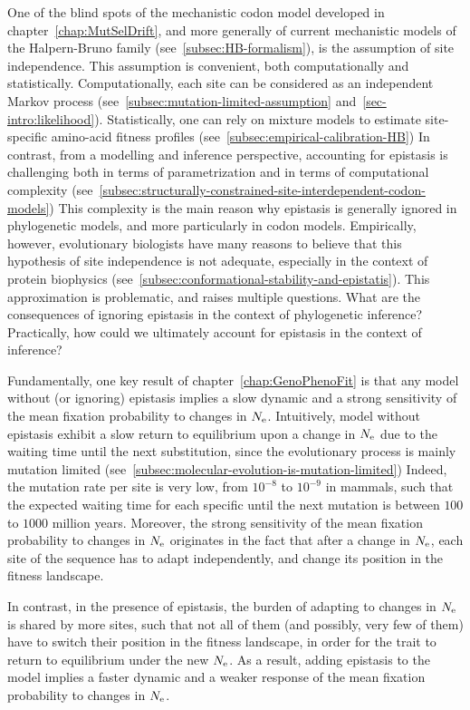 One of the blind spots of the mechanistic codon model developed in chapter~\ref{chap:MutSelDrift}, and more generally of current mechanistic models of the Halpern-Bruno family (see~\ref{subsec:HB-formalism}), is the assumption of site independence.
This assumption is convenient, both computationally and statistically.
Computationally, each site can be considered as an independent Markov process (see~\ref{subsec:mutation-limited-assumption} and~\ref{sec-intro:likelihood}).
Statistically, one can rely on mixture models to estimate site-specific amino-acid fitness profiles (see~\ref{subsec:empirical-calibration-HB})
In contrast, from a modelling and inference perspective, accounting for epistasis is challenging both in terms of parametrization and in terms of computational complexity (see~\ref{subsec:structurally-constrained-site-interdependent-codon-models})
This complexity is the main reason why epistasis is generally ignored in phylogenetic models, and more particularly in codon models.
Empirically, however, evolutionary biologists have many reasons to believe that this hypothesis of site independence is not adequate, especially in the context of protein biophysics (see~\ref{subsec:conformational-stability-and-epistatis}).
This approximation is problematic, and raises multiple questions.
What are the consequences of ignoring epistasis in the context of phylogenetic inference?
Practically, how could we ultimately account for epistasis in the context of inference?

Fundamentally, one key result of chapter~\ref{chap:GenoPhenoFit} is that any model without (or ignoring) epistasis implies a slow dynamic and a strong sensitivity of the mean fixation probability to changes in $N_{\textrm{e}}$.
Intuitively, model without epistasis exhibit a slow return to equilibrium upon a change in $N_{\textrm{e}}$ due to the waiting time until the next substitution, since the evolutionary process is mainly mutation limited (see~\ref{subsec:molecular-evolution-is-mutation-limited})
Indeed, the mutation rate per site is very low, from $10^{-8}$ to $10^{-9}$ in mammals, such that the expected waiting time for each specific until the next mutation is between $100$ to $1000$ million years.
Moreover, the strong sensitivity of the mean fixation probability to changes in $N_{\textrm{e}}$ originates in the fact that after a change in $N_{\textrm{e}}$, each site of the sequence has to adapt independently, and change its position in the fitness landscape.

In contrast, in the presence of epistasis, the burden of adapting to changes in $N_{\textrm{e}}$ is shared by more sites, such that not all of them (and possibly, very few of them) have to switch their position in the fitness landscape, in order for the trait to return to equilibrium under the new $N_{\textrm{e}}$.
As a result, adding epistasis to the model implies a faster dynamic and a weaker response of the mean fixation probability to changes in $N_{\textrm{e}}$.

